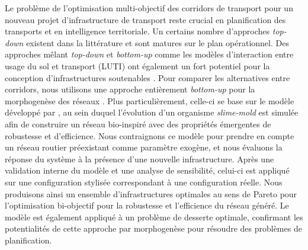 \documentclass[11pt]{article}
\begin{document}
\medskip

Le problème de l'optimisation multi-objectif des corridors de transport pour un nouveau projet d'infrastructure de transport reste crucial en planification des transports et en intelligence territoriale. Un certains nombre d'approches \emph{top-down} existent dans la littérature et sont matures sur le plan opérationnel. Des approches mêlant \emph{top-down} et \emph{bottom-up} comme les modèles d'interaction entre usage du sol et transport (LUTI) ont également un fort potentiel pour la conception d'infrastructures soutenables \citep{chang2006models,wegener2004land}. Pour comparer les alternatives entre corridors, nous utilisons une approche entièrement \emph{bottom-up} pour la morphogenèse des réseaux \citep{bebber2007biological}. Plus particulièrement, celle-ci se base sur le modèle développé par \cite{tero2010rules}, au sein duquel l'évolution d'un organisme \emph{slime-mold} est simulée afin de construire un réseau bio-inspiré avec des propriétés émergentes de robustesse et d'efficience. Nous contraignons ce modèle pour prendre en compte un réseau routier préexistant comme paramètre exogène, et nous évaluons la réponse du système à la présence d'une nouvelle infrastructure. Après une validation interne du modèle et une analyse de sensibilité, celui-ci est appliqué sur une configuration stylisée correspondant à une configuration réelle. Nous produisons ainsi un ensemble d'infrastructures optimales au sens de Pareto pour l'optimisation bi-objectif pour la robustesse et l'efficience du réseau généré. Le modèle est également appliqué à un problème de desserte optimale, confirmant les potentialités de cette approche par morphogen{\`e}se pour résoudre des problèmes de planification.











\end{document}

